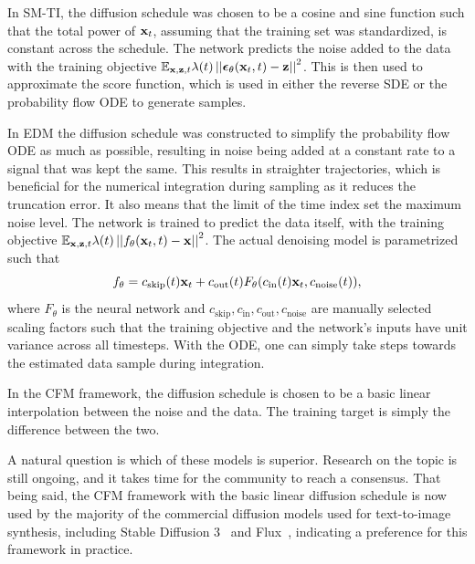 In SM-TI, the diffusion schedule was chosen to be a cosine and sine function such that the total power of $\mathbf{x}_t$, assuming that the training set was standardized, is constant across the schedule.
The network predicts the noise added to the data with the training objective
$\mathbb{E}_{\mathbf{x}, \mathbf{z}, t} \lambda(t) \left|\left| \boldsymbol{\epsilon}_\theta(\mathbf{x}_t, t) - \mathbf{z}\right|\right|^2$.
This is then used to approximate the score function, which is used in either the reverse SDE or the probability flow ODE to generate samples.

In EDM the diffusion schedule was constructed to simplify the probability flow ODE as much as possible, resulting in noise being added at a constant rate to a signal that was kept the same.
This results in straighter trajectories, which is beneficial for the numerical integration during sampling as it reduces the truncation error.
It also means that the limit of the time index set the maximum noise level.
The network is trained to predict the data itself, with the training objective $\mathbb{E}_{\mathbf{x}, \mathbf{z}, t} \lambda(t) \left|\left| f_\theta(\mathbf{x}_t, t) - \mathbf{x}\right|\right|^2$.
The actual denoising model is parametrized such that
\begin{equation}
    f_\theta = c_\text{skip}(t) \mathbf{x}_t + c_\text{out}(t)F_\theta(c_\text{in}(t)\mathbf{x}_t, c_\text{noise}(t)),
\end{equation}
where $F_\theta$ is the neural network and $c_\text{skip}, c_\text{in}, c_\text{out}, c_\text{noise}$ are manually selected scaling factors such that the training objective and the network's inputs have unit variance across all timesteps.
With the ODE, one can simply take steps towards the estimated data sample during integration.

In the CFM framework, the diffusion schedule is chosen to be a basic linear interpolation between the noise and the data.
The training target is simply the difference between the two.

A natural question is which of these models is superior.
Research on the topic is still ongoing, and it takes time for the community to reach a consensus.
That being said, the CFM framework with the basic linear diffusion schedule is now used by the majority of the commercial diffusion models used for text-to-image synthesis, including Stable Diffusion 3~\cite{SD3} and Flux~\cite{flux2024github}, indicating a preference for this framework in practice.

